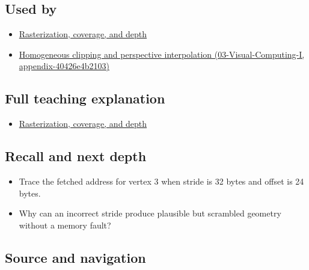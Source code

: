 \subsection{Used by}\label{used-by}

\begin{itemize}
\tightlist
\item
  \href{Continuous\%20Notes/University\%20-\%20Worlds,\%20Images\%20and\%20Inference\%20-\%20Graphics,\%20Vision\%20and\%20Photography\#Rasterization,\%20coverage,\%20and\%20depth}{Rasterization, coverage, and depth}
\item
  \href{}{Homogeneous clipping and perspective interpolation (03-Visual-Computing-I, appendix-40426e4b2103)}
\end{itemize}

\subsection{Full teaching explanation}\label{full-teaching-explanation}

\begin{itemize}
\tightlist
\item
  \href{Continuous\%20Notes/University\%20-\%20Worlds,\%20Images\%20and\%20Inference\%20-\%20Graphics,\%20Vision\%20and\%20Photography\#Rasterization,\%20coverage,\%20and\%20depth}{Rasterization, coverage, and depth}
\end{itemize}

\subsection{Recall and next depth}\label{recall-and-next-depth}

\begin{itemize}
\tightlist
\item
  Trace the fetched address for vertex 3 when stride is 32 bytes and offset is 24 bytes.
\item
  Why can an incorrect stride produce plausible but scrambled geometry without a memory fault?
\end{itemize}

\subsection{Source and navigation}\label{source-and-navigation}

